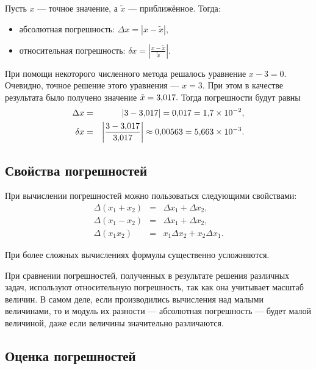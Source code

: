 Пусть $x$ — точное значение, а $\tilde{x}$ — приближённое. Тогда:
\begin{itemize}
\item абсолютная погрешность: $\Delta x=|x-\tilde{x}|,$
\item относительная погрешность: $\delta x=\left|\frac{x-\tilde{x}}{\tilde{x}}\right|.$\end{itemize}
\begin{example}
При помощи некоторого численного метода решалось уравнение $x-3=0.$
Очевидно, точное решение этого уравнения — $x=3.$ При этом в качестве
результата было получено значение $\tilde{x}=3{,}017.$ Тогда погрешности
будут равны
\begin{eqnarray*}
\Delta x & = & |3-3{,}017|=0{,}017=1{,}7\times10^{-2},\\
\delta x & = & \left|\frac{3-3{,}017}{3{,}017}\right|\approx0{,}00563=5{,}663\times10^{-3}.
\end{eqnarray*}

\end{example}
\smallskip{}



\subsection{Свойства погрешностей}

При вычислении погрешностей можно пользоваться следующими свойствами:
\begin{eqnarray*}
\Delta(x_{1}+x_{2}) & = & \Delta x_{1}+\Delta x_{2},\\
\Delta(x_{1}-x_{2}) & = & \Delta x_{1}+\Delta x_{2},\\
\Delta(x_{1}x_{2}) & = & x_{1}\Delta x_{2}+x_{2}\Delta x_{1}.
\end{eqnarray*}


При более сложных вычислениях формулы существенно усложняются.

При сравнении погрешностей, полученных в результате решения различных
задач, используют относительную погрешность, так как она учитывает
масштаб величин. В самом деле, если производились вычисления над малыми
величинами, то и модуль их разности — абсолютная погрешность — будет
малой величиной, даже если величины значительно различаются.


\subsection{Оценка погрешностей}

